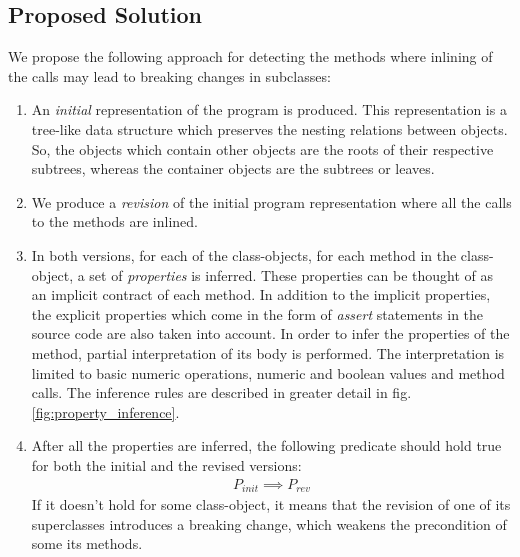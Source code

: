 \subsection{Proposed Solution}
\label{impl:unjustified_algo}
We propose the following approach for detecting the methods where inlining of the calls may lead to breaking changes in subclasses:
\begin{enumerate}
    \item An \textit{initial} representation of the program is produced. This representation is a tree-like data structure which preserves the nesting relations between objects. So, the objects which contain other objects are the roots of their respective subtrees, whereas the container objects are the subtrees or leaves.
    \item We produce a \textit{revision} of the initial program representation where all the calls to the methods are inlined.
    \item In both versions, for each of the class-objects, for each method in the class-object, a set of \textit{properties} is inferred.  These properties can be thought of as an implicit contract \cite{meyer} of each method. In addition to the implicit properties, the explicit properties which come in the form of \textit{assert} statements in the source code are also taken into account. In order to infer the properties of the method, partial interpretation of its body is performed. The interpretation is limited to basic numeric operations, numeric and boolean values and method calls. The inference rules are described in greater detail in fig. \ref{fig:property_inference}.
    \item After all the properties are inferred, the following predicate should hold true for both the initial and the revised versions:
          \begin{align}
              P_{init} \implies P_{rev}
              \label{fig:implication}
          \end{align}
          If it doesn't hold for some class-object, it means that the revision of one of its superclasses introduces a breaking change, which weakens the precondition of some its methods.
\end{enumerate}

